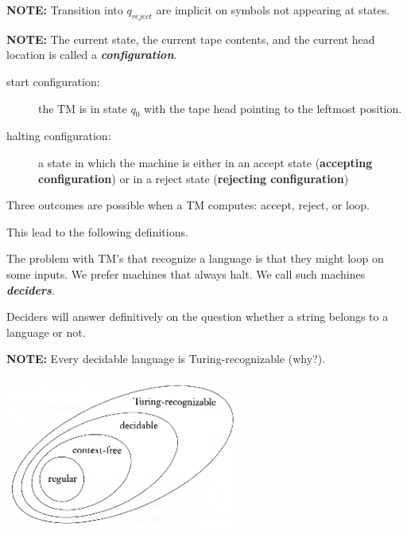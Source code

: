 \documentclass[a4paper,blends,pdf,colorBG,slideColor]{prosper}
\begin{document}
{\bf NOTE:} Transition into $q_{reject}$ are implicit on symbols not appearing
at states.
\es



{\bf NOTE:} The current state, the current tape contents, and the current head location
is called a {\bf\em configuration}.

\begin{description}
\item[start configuration:] the TM is in state $q_0$ with the tape head pointing
to the leftmost position.
\item[halting configuration:] a state in which the machine is either in an
accept state ({\bf accepting configuration}) or in a reject state ({\bf rejecting configuration})
\end{description}
\es

Three outcomes are possible when a TM computes: accept, reject, or loop.

This lead to the following definitions.

\begin{center}
\end{center}

The problem with TM's that recognize a language is that they might loop
on some inputs.  We prefer machines that always halt.  We call such machines
{\bf\em deciders}.


Deciders will answer definitively on the question whether a string belongs to a
language or not.

{\bf NOTE:} Every decidable language is Turing-recognizable (why?).

\es

\vspace{.5in}
\begin{center}
\includegraphics[height=50mm]{images/tm-hierarchy.eps}
\end{center}
\es
\end{document}
